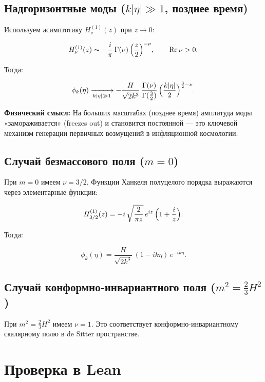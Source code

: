 \documentclass[12pt,a4paper]{article}
\begin{document}
\subsection{Надгоризонтные моды ($k|\eta| \gg 1$, позднее время)}

Используем асимптотику $H_\nu^{(1)}(z)$ при $z \to 0$:

\begin{equation}
H_\nu^{(1)}(z) \sim -\frac{i}{\pi}\,\Gamma(\nu)\,\Bigl(\frac{z}{2}\Bigr)^{-\nu}, \qquad \text{Re}\,\nu > 0.
\end{equation}

Тогда:

\begin{equation}
\phi_k(\eta) \xrightarrow[k|\eta|\gg 1]{} -\frac{H}{\sqrt{2k^3}}\,\frac{\Gamma(\nu)}{\Gamma(\tfrac{3}{2})}\,\Bigl(\frac{k|\eta|}{2}\Bigr)^{\frac{3}{2}-\nu}.
\end{equation}

\textbf{Физический смысл:} На больших масштабах (позднее время) амплитуда
моды «замораживается» (freezes out) и становится постоянной — это ключевой
механизм генерации первичных возмущений в инфляционной космологии.

\subsection{Случай безмассового поля ($m = 0$)}

При $m = 0$ имеем $\nu = 3/2$. Функции Ханкеля полуцелого порядка выражаются
через элементарные функции:

\begin{equation}
H_{3/2}^{(1)}(z) = -i\,\sqrt{\frac{2}{\pi z}}\,e^{iz}\,\Bigl(1 + \frac{i}{z}\Bigr).
\end{equation}

Тогда:

\begin{equation}
\phi_k(\eta) = \frac{H}{\sqrt{2k^3}}\,(1 - ik\eta)\,e^{-ik\eta}.
\end{equation}

\subsection{Случай конформно-инвариантного поля ($m^2 = \tfrac{2}{3}H^2$)}

При $m^2 = \frac{2}{3}H^2$ имеем $\nu = 1$. Это соответствует конформно-инвариантному
скалярному полю в de Sitter пространстве.

\section{Проверка в Lean}
\end{document}
